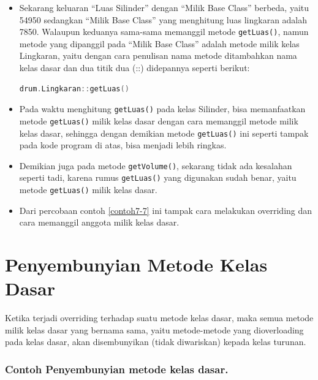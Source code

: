 \begin{itemize}
\item
  Sekarang keluaran ``Luas Silinder'' dengan ``Milik Base Class''
  berbeda, yaitu 54950 sedangkan ``Milik Base Class'' yang menghitung
  luas lingkaran adalah 7850. Walaupun keduanya sama-sama memanggil
  metode \texttt{getLuas()}, namun metode yang dipanggil pada ``Milik
  Base Class'' adalah metode milik kelas Lingkaran, yaitu dengan cara
  penulisan nama metode ditambahkan nama kelas dasar dan dua titik dua
  (::) didepannya seperti berikut:

\begin{lstlisting}[language=c++, numbers=none]
drum.Lingkaran::getLuas()
\end{lstlisting}
\item
  Pada waktu menghitung \texttt{getLuas()} pada kelas Silinder, bisa
  memanfaatkan metode \texttt{getLuas()} milik kelas dasar dengan cara
  memanggil metode milik kelas dasar, sehingga dengan demikian metode
  \texttt{getLuas()} ini seperti tampak pada kode program di atas, bisa
  menjadi lebih ringkas.
\item
  Demikian juga pada metode \texttt{getVolume()}, sekarang tidak ada
  kesalahan seperti tadi, karena rumus \texttt{getLuas()} yang digunakan
  sudah benar, yaitu metode \texttt{getLuas()} milik kelas dasar.
\item
  Dari percobaan contoh \ref{contoh7-7} ini tampak cara melakukan overriding dan cara
  memanggil anggota milik kelas dasar.
\end{itemize}

\section{Penyembunyian Metode Kelas
Dasar}\label{penyembunyian-metode-kelas-dasar}

Ketika terjadi overriding terhadap suatu metode kelas dasar, maka semua
metode milik kelas dasar yang bernama sama, yaitu metode-metode yang
dioverloading pada kelas dasar, akan disembunyikan (tidak diwariskan)
kepada kelas turunan.

\subsubsection*{Contoh Penyembunyian metode kelas dasar.}

